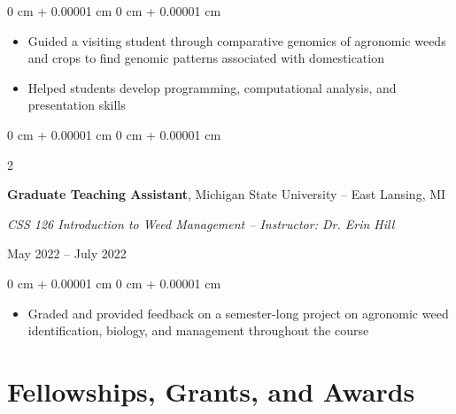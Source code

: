 \documentclass[10pt, letterpaper]{article}
\newenvironment{highlights}{
    \begin{itemize}[
        topsep=0.10 cm,
        parsep=0.10 cm,
        partopsep=0pt,
        itemsep=0pt,
        leftmargin=0 cm + 10pt
    ]
}{
    \end{itemize}
} %
\newenvironment{onecolentry}{
    \begin{adjustwidth}{
        0 cm + 0.00001 cm
    }{
        0 cm + 0.00001 cm
    }
}{
    \end{adjustwidth}
} %
\newenvironment{twocolentry}[2][]{
    \onecolentry
    \def\secondColumn{#2}
    \setcolumnwidth{\fill, 4.5 cm}
    \begin{paracol}{2}
}{
    \switchcolumn \raggedleft \secondColumn
    \end{paracol}
    \endonecolentry
} %
\begin{document}
        \vspace{0.10 cm}
        
        \begin{onecolentry}
            \begin{highlights}
                \item Guided a visiting student through comparative genomics of agronomic weeds and crops to find genomic patterns associated with domestication
                \item Helped students develop programming, computational analysis, and presentation skills
            \end{highlights}
        \end{onecolentry}        


        \vspace{0.2 cm}


        \begin{samepage} 
            \begin{twocolentry}{
                May 2022 – July 2022
                }
                \textbf{Graduate Teaching Assistant}, Michigan State University -- East Lansing, MI
                
                \vspace{0.05 cm}

                \textit{CSS 126 Introduction to Weed Management -- Instructor: Dr. Erin Hill}
            \end{twocolentry}
        \end{samepage}    
        
        \vspace{0.10 cm}
        
        \begin{onecolentry}
            \begin{highlights}
                \item Graded and provided feedback on a semester-long project on agronomic weed identification, biology, and management throughout the course
            \end{highlights}
        \end{onecolentry}  




    \section{Fellowships, Grants, and Awards}
\end{document}
